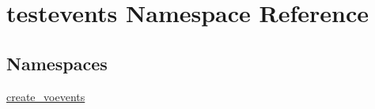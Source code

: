 \hypertarget{namespacetestevents}{\section{testevents Namespace Reference}
\label{namespacetestevents}
}
\subsection*{Namespaces}
\begin{DoxyCompactItemize}
\item 
\hyperlink{namespacetestevents_1_1create__voevents}{create\-\_\-voevents}
\end{DoxyCompactItemize}

